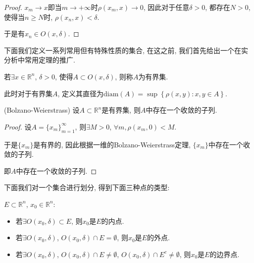 \documentclass[theorem=false,mathfont=none,openany,sub3section]{easybook}
\begin{document}
\begin{proof}
  $x_m \to x$即当$m \to +\infty$时$\rho(x_m,x)\to 0$, 因此对于任意$\delta >0$, 都存在$N>0$, 使得当$n\geqslant N$时, $\rho(x_n,x)<\delta$.\par
  于是有$x_n \in O(x,\delta)$.\par
\end{proof}

下面我们定义一系列常用但有特殊性质的集合, 在这之前, 我们首先给出一个在实分析中常用定理的推广.\par

\begin{definition}
  若$\exists x \in \mathbb{R}^n$, $\delta >0$, 使得$A\subset O(x,\delta)$, 则称$A$为有界集.\par
  此时对于有界集$A$, 定义其直径为$\text{diam}(A)=\sup \left\{\rho(x,y): x,y\in A\right\}$.\par
\end{definition}

\begin{theorem}
  (Bolzano-Weierstrass) 设$A\subset \mathbb{R}^n$是有界集, 则$A$中存在一个收敛的子列.\par
\end{theorem}

\begin{proof}
  设$A=\{x_m\}_{m=1}^{\infty}$, 则$\exists M>0$, $\forall m, \rho(x_m,0)<M$.\par
  于是$\{x_m\}$是有界的, 因此根据一维的Bolzano-Weierstrass定理, $\{x_m\}$中存在一个收敛的子列.\par
  即$A$中存在一个收敛的子列.\par
\end{proof}

下面我们对一个集合进行划分, 得到下面三种点的类型:\par

\begin{definition}
  $E\subset \mathbb{R}^n$, $x_0 \in \mathbb{R}^n$:\par
  \begin{itemize}
    \item 若$\exists O(x_0, \delta) \subset E$, 则$x_0$是$E$的内点.
    \item 若$\exists O(x_0, \delta)$, $O(x_0,\delta)\cap E = \emptyset$, 则$x_0$是$E$的外点.
    \item 若$\exists O(x_0, \delta)$, $O(x_0,\delta)\cap E \ne \emptyset$, $O(x_0,\delta)\cap E^{c} \ne \emptyset$, 则$x_0$是$E$的边界点.
  \end{itemize}
\end{definition}
\end{document}
